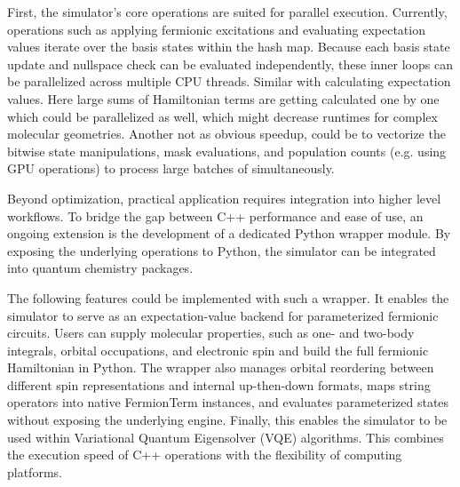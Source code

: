First, the simulator’s core operations are suited for parallel execution.
Currently, operations such as applying fermionic excitations and evaluating expectation values iterate over the basis states within the hash map.
Because each basis state update and nullspace check can be evaluated independently, these inner loops can be parallelized across multiple CPU threads.
Similar with calculating expectation values.
Here large sums of Hamiltonian terms are getting calculated one by one which could be parallelized as well, which might decrease runtimes for complex molecular geometries.
Another not as obvious speedup, could be to vectorize the bitwise state manipulations, mask evaluations, and population counts (e.g. using GPU operations) to process large batches of simultaneously.

Beyond optimization, practical application requires integration into higher level workflows.
To bridge the gap between C++ performance and ease of use, an ongoing extension is the development of a dedicated Python wrapper module.
By exposing the underlying operations to Python, the simulator can be integrated into quantum chemistry packages.

The following features could be implemented with such a wrapper.
It enables the simulator to serve as an expectation-value backend for parameterized fermionic circuits.
Users can supply molecular properties, such as one- and two-body integrals, orbital occupations, and electronic spin and build the full fermionic Hamiltonian in Python.
The wrapper also manages orbital reordering between different spin representations and internal up-then-down formats, maps string operators into native FermionTerm instances, and evaluates parameterized states without exposing the underlying engine.
Finally, this enables the simulator to be used within Variational Quantum Eigensolver (VQE) algorithms.
This combines the execution speed of C++ operations with the flexibility of computing platforms.

